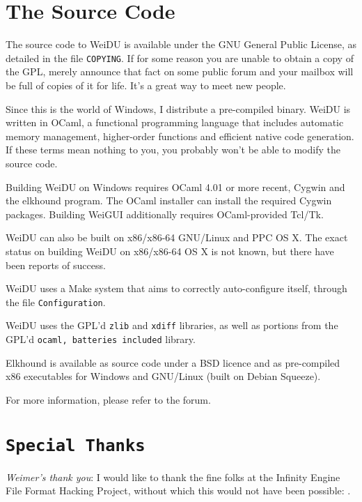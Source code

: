 \documentclass{article}
\def\DEFINE#1{{\tt \bf #1}\label{#1}\index{#1}}
\def\t#1{{\tt #1}}
\begin{document}
\section{The Source Code}

The source code to WeiDU is available under the GNU General Public License,
as detailed in the file \t{COPYING}. If for some reason you are unable to
obtain a copy of the GPL, merely announce that fact on some public forum
and your mailbox will be full of copies of it for life. It's a great way to
meet new people.

Since this is the world of Windows, I distribute a pre-compiled binary.
WeiDU is written in OCaml, a functional programming language that includes
automatic memory management, higher-order functions and efficient native
code generation. If these terms mean nothing to you, you probably won't be
able to modify the source code.

Building WeiDU on Windows requires OCaml 4.01 or more recent, Cygwin and the
elkhound program. The OCaml installer can install the required Cygwin
packages. Building WeiGUI additionally requires OCaml-provided Tcl/Tk.

WeiDU can also be built on x86/x86-64 GNU/Linux and PPC OS X. The exact status
on building WeiDU on x86/x86-64 OS X is not known, but there have been reports
of success.

WeiDU uses a Make system that aims to correctly auto-configure itself, through
the file \t{Configuration}.

WeiDU uses the GPL'd \t{zlib} and \t{xdiff} libraries, as well as portions from
the GPL'd \t{ocaml, batteries included} library.

Elkhound is available as source code under a BSD licence and as
pre-compiled x86 executables for Windows and GNU/Linux (built on
Debian Squeeze).

For more information, please refer to the forum.

\section{\DEFINE{Special Thanks}}
{\em Weimer's thank you}:
I would like to thank the fine folks at the Infinity Engine File Format
Hacking Project, without which this would not have been possible:
.
\end{document}
